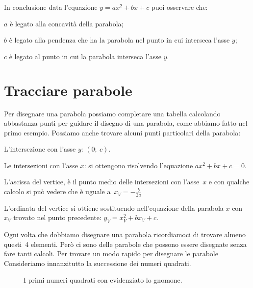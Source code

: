 In conclusione data l'equazione $y=ax^2+bx+c$ puoi osservare che:
\begin{enumerate*}
 \item $a$ è legato alla concavità della parabola;
 \item $b$ è legato alla pendenza che ha la parabola nel punto in cui 
  interseca l'asse $y$;
 \item $c$ è legato al punto in cui la parabola interseca l'asse $y$.
\end{enumerate*}


\section{Tracciare parabole}
\label{sec:parabola_disegno}

Per disegnare una parabola possiamo completare una tabella calcolando 
abbastanza punti per guidare il disegno di una parabola, come abbiamo fatto
nel primo esempio.
Possiamo anche trovare alcuni punti particolari della parabola:

\begin{enumerate*}
 \item L'intersezione con l'asse $y$: $(0;~c)$.
 \item Le intersezioni con l'asse $x$: si ottengono risolvendo l'equazione
  $ax^2+bx+c=0$.
 \item L'ascissa del vertice, è il punto medio delle intersezioni con 
  l'asse~$x$ e con qualche calcolo si può vedere che è uguale 
  a~$x_V=-\frac{b}{2a}$
 \item L'ordinata del vertice si ottiene sostituendo nell'equazione della 
  parabola $x$ con $x_V$ trovato nel punto precedente: $y_V=x_V^2+bx_V+c$.
\end{enumerate*}

Ogni volta che dobbiamo disegnare una parabola ricordiamoci di trovare almeno
questi~4 elementi. Però ci sono delle parabole che possono essere disegnate 
senza fare tanti calcoli. Per trovare un modo rapido per disegnare le parabole 
Consideriamo innanzitutto la successione dei numeri quadrati.

 \begin{inaccessibleblock}
\begin{figure}
  \quadrati
  \caption{I primi numeri quadrati con evidenziato lo gnomone.}
  \label{fig:parabola_quadrati}
\end{figure}
\end{inaccessibleblock}


